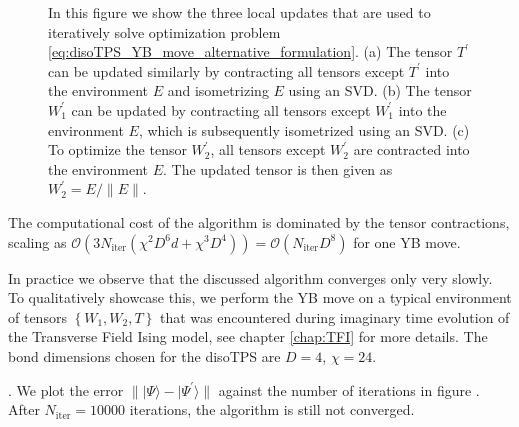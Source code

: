 \begin{figure}
\begin{subfigure}[c]{0.85\textwidth}
		\caption{}\label{fig:YB_move_iterate_polar_optimize_W2}
	\end{subfigure}%
	\caption{In this figure we show the three local updates that are used to iteratively solve optimization problem \eqref{eq:disoTPS_YB_move_alternative_formulation}. (a) The tensor $T^\prime$ can be updated similarly by contracting all tensors except $T^\prime$ into the environment $E$ and isometrizing $E$ using an SVD. (b) The tensor $W_1^\prime$ can be updated by contracting all tensors except $W_1^\prime$ into the environment $E$, which is subsequently isometrized using an SVD. (c) To optimize the tensor $W_2^\prime$, all tensors except $W_2^\prime$ are contracted into the environment $E$. The updated tensor is then given as $W_2^\prime = E/\lVert E\rVert$.}
	\label{fig:YB_move_iterate_polar}
\end{figure}
The computational cost of the algorithm is dominated by the tensor contractions, scaling as $\mathcal{O}(3N_\text{iter}(\chi^2D^6d + \chi^3D^4)) = \mathcal{O}(N_\text{iter}D^8)$ for one YB move.\par

In practice we observe that the discussed algorithm converges only very slowly. To qualitatively showcase this, we perform the YB move on a typical environment of tensors $\left\{W_1, W_2, T\right\}$ that was encountered during imaginary time evolution of the Transverse Field Ising model, see chapter \ref{chap:TFI} for more details. The bond dimensions chosen for the disoTPS are $D = 4$, $\chi = 24$. \par. We plot the error $\lVert|\Psi\rangle-|\Psi^\prime\rangle\rVert$ against the number of iterations in figure . After $N_\text{iter}=10000$ iterations, the algorithm is still not converged.